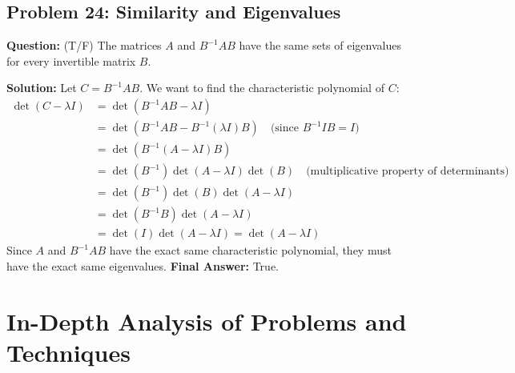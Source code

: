 \documentclass[11pt, a4paper]{article}
\theoremstyle{definition}
\theoremstyle{remark}
\begin{document}
\subsection{Problem 24: Similarity and Eigenvalues}
\textbf{Question:} (T/F) The matrices $A$ and $B^{-1}AB$ have the same sets of eigenvalues for every invertible matrix $B$.

\textbf{Solution:}
Let $C = B^{-1}AB$. We want to find the characteristic polynomial of $C$:
\begin{align*}
    \det(C - \lambda I) &= \det(B^{-1}AB - \lambda I) \\
    &= \det(B^{-1}AB - B^{-1}(\lambda I)B) \quad \text{(since $B^{-1}IB = I$)} \\
    &= \det(B^{-1}(A - \lambda I)B) \\
    &= \det(B^{-1}) \det(A - \lambda I) \det(B) \quad \text{(multiplicative property of determinants)} \\
    &= \det(B^{-1}) \det(B) \det(A - \lambda I) \\
    &= \det(B^{-1}B) \det(A - \lambda I) \\
    &= \det(I) \det(A - \lambda I) = \det(A - \lambda I)
\end{align*}
Since $A$ and $B^{-1}AB$ have the exact same characteristic polynomial, they must have the exact same eigenvalues.
\textbf{Final Answer:} True.

\newpage
\section{In-Depth Analysis of Problems and Techniques}
\end{document}

